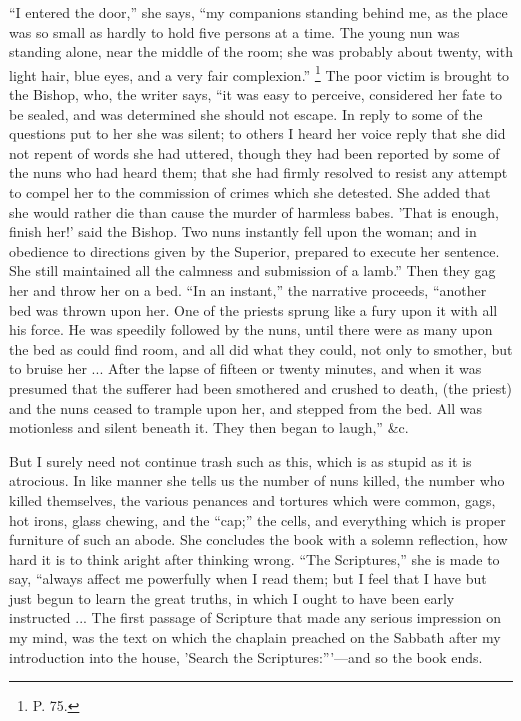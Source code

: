 ``I entered the door,'' she says, ``my
companions standing behind me, as the place was so small
as hardly to hold five persons at a time. The young nun
was standing alone, near the middle of the room; she was
probably about twenty, with light hair, blue eyes, and a
very fair complexion.'' \footnote{P. 75.} The poor victim is
brought to the Bishop, who, the writer says, ``it was
easy to perceive, considered her fate to be sealed, and
was determined she should not escape. In reply to some of
the questions put to her she was silent; to others I
heard her voice reply that she did not repent of words
she had uttered, though they had been reported by some of
the nuns who had heard them; that she had firmly resolved
to resist any attempt to compel her to the commission of
crimes which she detested. She added that she would
rather die than cause the murder of harmless babes. 'That
is enough, finish her!' said the Bishop. Two nuns
instantly fell upon the woman; and in obedience to
directions given by the Superior, prepared to execute her
sentence. She still maintained all the calmness and
submission of a lamb.'' Then they gag her and throw
her on a bed. ``In an instant,'' the narrative
proceeds, ``another bed was thrown upon her. One of
the priests sprung like a fury upon it with all his
force. He was speedily followed by the nuns, until there
were as many upon the bed as could find room, and all did
what they could, not only to smother, but to bruise her
... After the lapse of fifteen or twenty minutes, and
when it was presumed that the sufferer had been smothered
and crushed to death, (the priest) and the nuns ceased to
trample upon her, and stepped from the bed. All was
motionless and silent beneath it. They then began to
laugh,'' \&c.

But I surely need not continue trash such as this,
which is as stupid as it is atrocious. In like manner she
tells us the number of nuns killed, the number who killed
themselves, the various penances and tortures which were
common, gags, hot irons, glass chewing, and the
``cap;'' the cells, and everything which is
proper furniture of such an abode. She concludes the book
with a solemn reflection, how hard it is to think aright
after thinking wrong. ``The Scriptures,'' she is
made to say, ``always affect me powerfully when I
read them; but I feel that I have but just begun to learn
the great truths, in which I ought to have been early
instructed ... The first passage of Scripture that made
any serious impression on my mind, was the text on which
the chaplain preached on the Sabbath after my
introduction into the house, 'Search the
Scriptures:'''—and so the book ends.


